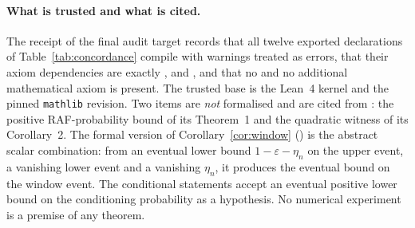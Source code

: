 \documentclass[11pt,a4paper]{article}
\theoremstyle{plain}
\theoremstyle{definition}
\theoremstyle{remark}
\begin{document}
\paragraph{What is trusted and what is cited.}
The receipt of the final audit target records that all twelve exported declarations of Table~\ref{tab:concordance} compile with warnings treated as errors, that their axiom dependencies are exactly ,  and , and that no  and no additional mathematical axiom is present. The trusted base is the Lean~4 kernel and the pinned \texttt{mathlib} revision. Two items are \emph{not} formalised and are cited from \cite{hordijk2016variable}: the positive RAF-probability bound of its Theorem~1 and the quadratic witness of its Corollary~2. The formal version of Corollary~\ref{cor:window} () is the abstract scalar combination: from an eventual lower bound $1-\varepsilon-\eta_n$ on the upper event, a vanishing lower event and a vanishing $\eta_n$, it produces the eventual bound on the window event. The conditional statements accept an eventual positive lower bound on the conditioning probability as a hypothesis. No numerical experiment is a premise of any theorem.
\end{document}
